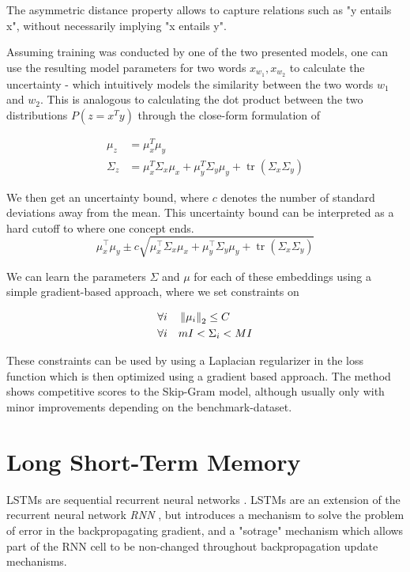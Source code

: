 \documentclass[a4paper,12pt,twoside,openright]{report}
\begin{document}
The asymmetric distance property allows to capture relations such as "y entails x", without necessarily implying "x entails y".

Assuming training was conducted by one of the two presented models,  one can use the resulting model parameters for two words $x_{w_1}, x_{w_2}$ to calculate the uncertainty - which intuitively models the similarity between the two words $w_1$ and $w_2$.
This is analogous to calculating the dot product between the two distributions $P(z=x^T y)$ through the close-form formulation of

\begin{align}
\mu_z &= \mu_x^T \mu_y \\
\Sigma_z &= \mu_{x}^T \Sigma_{x} \mu_{x}+\mu_{y}^T \Sigma_{y} \mu_{y}+\operatorname{tr}\left(\Sigma_{x} \Sigma_{y}\right)
\end{align}

We then get an uncertainty bound, where $c$ denotes the number of standard deviations away from the mean.
This uncertainty bound can be interpreted as a hard cutoff to where one concept ends.
\begin{equation}
\mu_{x}^{\top} \mu_{y} \pm c \sqrt{\mu_{x}^{\top} \Sigma_{x} \mu_{x}+\mu_{y}^{\top} \Sigma_{y} \mu_{y}+\operatorname{tr}\left(\Sigma_{x} \Sigma_{y}\right)}
\end{equation}

We can learn the parameters $\Sigma$ and $\mu$ for each of these embeddings using a simple gradient-based approach, where we set constraints on 

\begin{align}
\forall i \quad & \left\lVert \mu_i \right\rVert_2  \leq C\\
\forall i \quad & m I <  \Sigma_i < M I
\end{align}

These constraints can be used by using a Laplacian regularizer in the loss function which is then optimized using a gradient based approach. 
The method shows competitive scores to the Skip-Gram model, although usually only with minor improvements depending on the benchmark-dataset.

\section{Long Short-Term Memory}\label{appendix:LSTM}

LSTMs are sequential recurrent neural networks \cite{hochreiter97}.
LSTMs are an extension of the recurrent neural network \textit{RNN} \cite{rumelhart85}, but introduces a mechanism to solve the problem of error in the backpropagating gradient, and a "sotrage" mechanism which allows part of the RNN cell to be non-changed throughout backpropagation update mechanisms.
\end{document}
